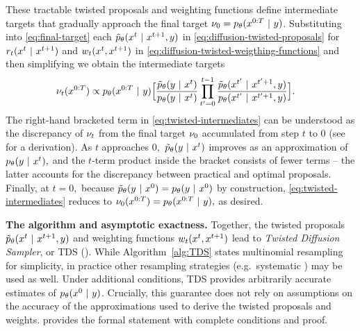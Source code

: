 These tractable twisted proposals and weighting functions define intermediate targets that gradually approach the final target $\nu_0=p_{\theta} (x^{0:T} ~\vert~ y)$.
Substituting into \cref{eq:final-target} each $\tilde p_\theta(x^{t} ~\vert~ x^{t+1}, y)$ in \cref{eq:diffusion-twisted-proposals} for $r_t(x^{t}~\vert~ x^{t+1})$ and $w_t(x^{t}, x^{t+1})$ in \cref{eq:diffusion-twisted-weigthing-functions} %
and then simplifying we obtain the intermediate targets  
\begin{align}\label{eq:twisted-intermediates}
   \nu_t(\dt{x}{0:T}) %
   &\propto  \pmodel(\dt{x}{0:T}\mid y) \Big[\frac{\twist(y\mid \xt)}{\pmodel(y \mid \xt)} \prod_{t^\prime=0}^{t-1} \frac{\pTwist(\dt{x}{t^\prime} \mid \dt{x}{t^\prime +1}, y)}{
   \pmodel(\dt{x}{t^\prime}\mid \dt{x}{t^\prime + 1}, y)} \Big].
\end{align}
The right-hand bracketed term in \cref{eq:twisted-intermediates} 
can be understood as the discrepancy of $\nu_t$ from the final target $\nu_0$ accumulated from step $t$ to $0$ (see  for a derivation).
As $t$ approaches $0,$
$\tilde p_\theta(y~\vert~ x^{t})$ improves as an approximation of $p_{\theta}(y ~\vert~ x^{t}),$ and the $t$-term product inside the bracket consists of fewer terms -- the latter accounts for the discrepancy between practical and optimal proposals. 
Finally, at $t=0,$ because $\tilde p_\theta(y~\vert~ x^{0}) = p_{\theta}(y ~\vert~ x^{0})$ by construction, \cref{eq:twisted-intermediates} reduces to $\nu_0(x^{0:T}) = p_{\theta}(x^{0:T}~\vert~ y),$
as desired.

\textbf{The \methodshort{} algorithm and  asymptotic exactness.}
Together, the twisted  proposals $\tilde p_\theta(x^{t}~\vert~ x^{t+1}, y)$  and  weighting functions $w_t(x^{t}, x^{t+1})$ lead to \emph{Twisted Diffusion Sampler}, or TDS ().
While Algorithm~\ref{alg:TDS} states multinomial resampling for simplicity, in practice other resampling strategies (e.g.\ systematic \citep[Ch. 9]{chopin2020introduction}) may be used as well.
Under additional conditions, TDS provides arbitrarily accurate estimates of $p_{\theta} (x^{0} ~\vert~ y)$.
Crucially, this guarantee does not rely on assumptions on the accuracy of the approximations used to derive the twisted proposals and weights.  provides the formal statement with complete conditions and proof.



